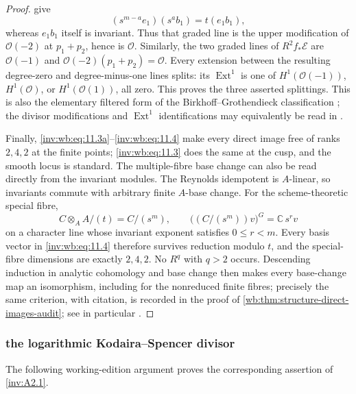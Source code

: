 \begin{proof}
give
\[
 (s^{m-a}e_1)(s^ab_1)=t(e_1b_1),
\]
whereas $e_1b_1$ itself is invariant.  Thus that graded line is the upper
modification of $\mathcal O(-2)$ at $p_1+p_2$, hence is $\mathcal O$.
Similarly, the two graded lines of $R^2f_*\mathcal E$ are
$\mathcal O(-1)$ and
$\mathcal O(-2)(p_1+p_2)=\mathcal O$.  Every extension between the resulting
degree-zero and degree-minus-one lines splits: its $\operatorname{Ext}^1$
is one of $H^1(\mathcal O(-1))$, $H^1(\mathcal O)$, or
$H^1(\mathcal O(1))$, all zero.  This proves the three asserted splittings.
This is also the elementary filtered form of the
Birkhoff--Grothendieck classification
\cite[Theorem~2.1, p.~126]{Grothendieck1957}; the divisor modifications and
$\operatorname{Ext}^1$ identifications may equivalently be read in
\cite[Tags 0C6K, 0B3A, and 01XT]{StacksProject}.

Finally, \eqref{inv:wb:eq:11.3a}--\eqref{inv:wb:eq:11.4} make every direct image free of ranks $2,4,2$ at
the finite points; \eqref{inv:wb:eq:11.3} does the same at the cusp, and the smooth locus is
standard.  The multiple-fibre base change can also be read directly from the
invariant modules.  The Reynolds idempotent is $A$-linear, so invariants
commute with arbitrary finite $A$-base change.  For the scheme-theoretic
special fibre,
\[
 C\otimes_AA/(t)=C/(s^m),
 \qquad
 \bigl((C/(s^m))v\bigr)^G=\mathbb C\,s^rv
\]
on a character line whose invariant exponent satisfies $0\le r<m$.
Every basis vector in \eqref{inv:wb:eq:11.4} therefore survives reduction modulo $t$, and
the special-fibre dimensions are exactly $2,4,2$.  No $R^q$ with $q>2$
occurs.  Descending induction in analytic cohomology and base change then
makes every base-change map an isomorphism, including for the nonreduced
finite fibres; precisely the same criterion, with citation, is recorded in
the proof of
\cref{wb:thm:structure-direct-images-audit}; see in particular
\cite[Chapter~III, \S3, Theorem~3.4 and Corollary~3.10]{BS76}.
\end{proof}

\subsubsection{the logarithmic Kodaira--Spencer divisor}\label{inv:wbproof:prop:log-ks-divisor}
The following working-edition argument proves the corresponding assertion of \cref{inv:A2.1}.


